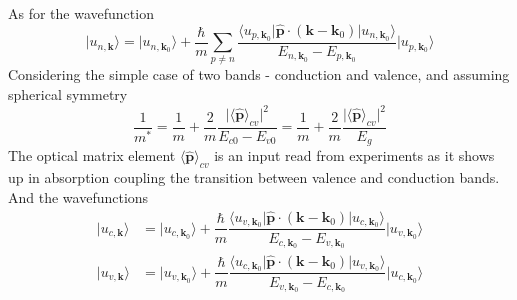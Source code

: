 \documentclass[aps,prb,onecolumn,notitlepage,showpacs,floatfix,superscriptaddress]{revtex4-1}
\newcommand{\bk}{{\bm k}}
\newcommand{\bkz}{{\bm k_0}}
\newcommand{\op}{\hat{\bm p}}
\begin{document}
As for the wavefunction
\begin{equation}
\vert u_{n,\bk} \rangle = \vert u_{n,\bkz} \rangle + \dfrac{\hbar}{m} \sum_{p \neq n} \dfrac{\langle  u_{p,\bkz} \vert\op\cdot(\bk-\bkz) \vert  u_{n,\bkz}\rangle }{E_{n,\bkz}-E_{p,\bkz}} \vert u_{p,\bkz} \rangle
\end{equation}
Considering the simple case of two bands - conduction and valence, and assuming spherical symmetry
\begin{equation}
\dfrac{1}{m^*} = \dfrac{1}{m} + \dfrac{2}{m} \dfrac{\vert \langle \op \rangle_{cv}\vert^2}{E_{c0}-E_{v0}} = \dfrac{1}{m} + \dfrac{2}{m} \dfrac{\vert \langle \op \rangle_{cv}\vert^2}{E_g}
\end{equation}
The optical matrix element $\langle \op \rangle_{cv}$ is an input read from experiments as it shows up in absorption coupling the transition between valence and conduction bands. And the wavefunctions
\begin{equation}
\begin{split}
\vert u_{c,\bk} \rangle &= \vert u_{c,\bkz} \rangle + \dfrac{\hbar}{m}  \dfrac{\langle  u_{v,\bkz} \vert\op\cdot(\bk-\bkz) \vert  u_{c,\bkz}\rangle }{E_{c,\bkz}-E_{v,\bkz}} \vert u_{v,\bkz} \rangle \\
\vert u_{v,\bk} \rangle &= \vert u_{v,\bkz} \rangle + \dfrac{\hbar}{m}  \dfrac{\langle  u_{c,\bkz} \vert\op\cdot(\bk-\bkz) \vert  u_{v,\bkz}\rangle }{E_{v,\bkz}-E_{c,\bkz}} \vert u_{c,\bkz} \rangle
\end{split}
\end{equation}
\end{document}
